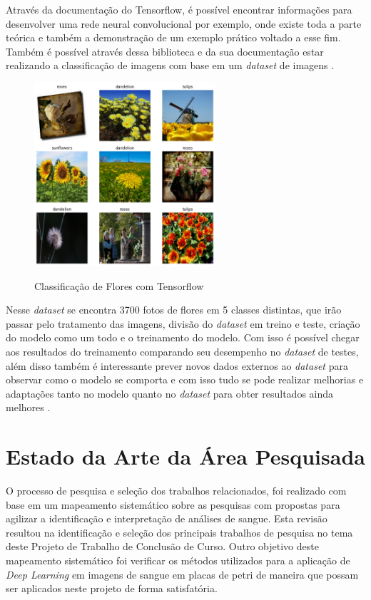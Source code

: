 Através da documentação do Tensorflow, é possível encontrar informações para desenvolver uma rede neural convolucional por exemplo, onde existe toda a parte teórica e também a demonstração de um exemplo prático voltado a esse fim. Também é possível através dessa biblioteca e da sua documentação estar realizando a classificação de imagens com base em um \emph{dataset} de imagens \cite{websiteTensorFlow}.

\begin{figure}[!htb]
	\centering
	\caption{Classificação de Flores com Tensorflow}
	\includegraphics[width=0.60\textwidth]{img/tensorflowExample.png}
	\label{fig:tensorflowExample}
\end{figure}

Nesse \emph{dataset} se encontra 3700 fotos de flores em 5 classes distintas, que irão passar pelo tratamento das imagens, divisão do \emph{dataset} em treino e teste, criação do modelo como um todo e o treinamento do modelo. Com isso é possível chegar aos resultados do treinamento comparando seu desempenho no \emph{dataset} de testes, além disso também é interessante prever novos dados externos ao \emph{dataset} para observar como o modelo se comporta e com isso tudo se pode realizar melhorias e adaptações tanto no modelo quanto no \emph{dataset} para obter resultados ainda melhores \cite{websiteTensorFlow}.

\chapter{Estado da Arte da Área Pesquisada}
\label{chap:mapeamento}

O processo de pesquisa e seleção dos trabalhos relacionados, foi realizado com base em um mapeamento sistemático sobre as pesquisas com propostas para agilizar a identificação e interpretação de análises de sangue. Esta revisão resultou na identificação e seleção dos principais trabalhos de pesquisa no tema deste Projeto de Trabalho de Conclusão de Curso. Outro objetivo deste mapeamento sistemático foi verificar os métodos utilizados para a aplicação de \emph{Deep Learning} em imagens de sangue em placas de petri de maneira que possam ser aplicados neste projeto de forma satisfatória.

